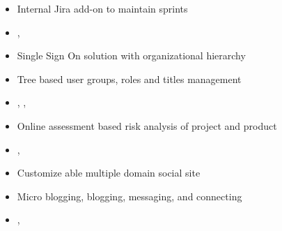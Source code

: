 \documentclass[10pt,a4paper,ragged2e]{altacv}
\begin{document}
\divider

\begin{itemize}
\item Internal Jira add-on to maintain sprints
\item {}, 
\end{itemize}

\clearpage


\begin{itemize}
\item Single Sign On solution with organizational hierarchy
\item Tree based user groups, roles and titles management
\item {}, , 
\end{itemize}

\divider

\begin{itemize}
\item Online assessment based risk analysis of project and product
\item {}, 
\end{itemize}

\divider

\begin{itemize}
\item Customize able multiple domain social site
\item Micro blogging, blogging, messaging, and connecting
\item {}, 
\end{itemize}


\medskip


%
\end{document}
